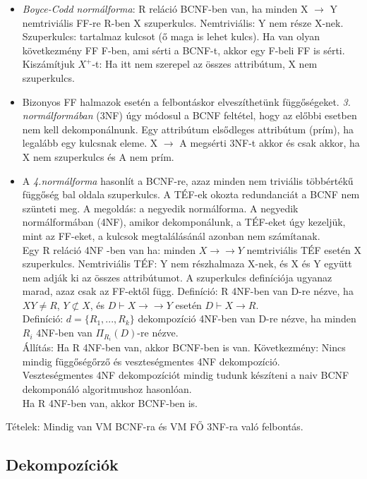 \documentclass[margin=0px]{article}
\begin{document}
	\begin{itemize}
		\item \textit{Boyce-Codd normálforma}: R reláció BCNF-ben van, ha minden X $\to$ Y nemtriviális FF-re R-ben X szuperkulcs. Nemtriviális: Y nem része X-nek. Szuperkulcs: tartalmaz kulcsot (ő maga is lehet kulcs). Ha van olyan következmény FF F-ben, ami sérti a BCNF-t, akkor egy F-beli FF is sérti. Kiszámítjuk $X^+$-t: Ha itt nem szerepel az összes attribútum, X nem szuperkulcs.
		\item Bizonyos FF halmazok esetén a felbontáskor elveszíthetünk függőségeket. \textit{3. normálformában} (3NF) úgy módosul a BCNF feltétel, hogy az előbbi esetben nem kell dekomponálnunk. Egy attribútum elsődleges attribútum (prím), ha legalább egy kulcsnak eleme. X $\to$ A megsérti 3NF-t akkor és csak akkor, ha X nem szuperkulcs és A nem prím.
		\item A \textit{4.normálforma} hasonlít a BCNF-re, azaz minden nem triviális többértékű függőség bal oldala szuperkulcs. A TÉF-ek okozta redundanciát a BCNF nem szünteti meg. A megoldás: a negyedik normálforma. A negyedik normálformában (4NF), amikor dekomponálunk, a TÉF-eket úgy kezeljük, mint az FF-eket, a kulcsok megtalálásánál azonban nem számítanak.\\
		Egy R reláció 4NF -ben van ha: minden $X \to\to Y$ nemtriviális TÉF esetén X szuperkulcs. Nemtriviális TÉF: Y nem részhalmaza X-nek, és X és Y együtt nem adják ki az összes attribútumot. A szuperkulcs definíciója ugyanaz marad, azaz csak az FF-ektől függ.
		Definíció: R 4NF-ben van D-re nézve, ha $XY \neq R$, $Y \not\subset X$, és $D \vdash X \to\to Y$ esetén $D \vdash X \to R$.\\
		Definíció: $d=\{R_1,...,R_k\}$ dekompozíció 4NF-ben van D-re nézve, ha minden $R_i$ 4NF-ben van $\Pi_{R_i}(D)$-re nézve.\\
		Állítás: Ha R 4NF-ben van, akkor BCNF-ben is van. Következmény: Nincs mindig függőségőrző és veszteségmentes 4NF dekompozíció.\\
		Veszteségmentes 4NF dekompozíciót mindig tudunk készíteni a naiv BCNF dekomponáló algoritmushoz hasonlóan. \\
		Ha R 4NF-ben van, akkor BCNF-ben is.
	\end{itemize}
	Tételek: Mindig van VM BCNF-ra és VM FŐ 3NF-ra való felbontás.
	
	\subsection{Dekompozíciók}
	
\end{document}
